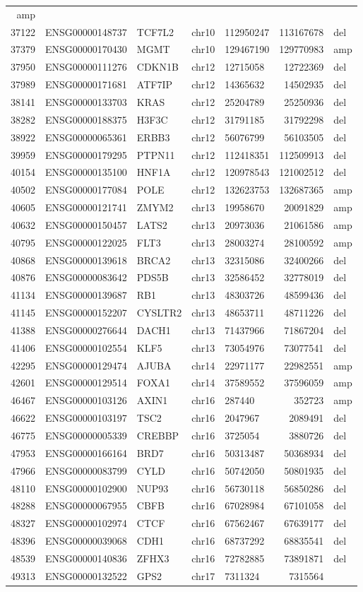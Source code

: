 \documentclass[]{article}
\begin{document}
\begin{longtable}[]{@{}rrlrlrl@{}}
amp\tabularnewline
37122 & ENSG00000148737 & TCF7L2 & chr10 & 112950247 & 113167678 &
del\tabularnewline
37379 & ENSG00000170430 & MGMT & chr10 & 129467190 & 129770983 &
amp\tabularnewline
37950 & ENSG00000111276 & CDKN1B & chr12 & 12715058 & 12722369 &
del\tabularnewline
37989 & ENSG00000171681 & ATF7IP & chr12 & 14365632 & 14502935 &
del\tabularnewline
38141 & ENSG00000133703 & KRAS & chr12 & 25204789 & 25250936 &
del\tabularnewline
38282 & ENSG00000188375 & H3F3C & chr12 & 31791185 & 31792298 &
del\tabularnewline
38922 & ENSG00000065361 & ERBB3 & chr12 & 56076799 & 56103505 &
del\tabularnewline
39959 & ENSG00000179295 & PTPN11 & chr12 & 112418351 & 112509913 &
del\tabularnewline
40154 & ENSG00000135100 & HNF1A & chr12 & 120978543 & 121002512 &
del\tabularnewline
40502 & ENSG00000177084 & POLE & chr12 & 132623753 & 132687365 &
amp\tabularnewline
40605 & ENSG00000121741 & ZMYM2 & chr13 & 19958670 & 20091829 &
amp\tabularnewline
40632 & ENSG00000150457 & LATS2 & chr13 & 20973036 & 21061586 &
amp\tabularnewline
40795 & ENSG00000122025 & FLT3 & chr13 & 28003274 & 28100592 &
amp\tabularnewline
40868 & ENSG00000139618 & BRCA2 & chr13 & 32315086 & 32400266 &
del\tabularnewline
40876 & ENSG00000083642 & PDS5B & chr13 & 32586452 & 32778019 &
del\tabularnewline
41134 & ENSG00000139687 & RB1 & chr13 & 48303726 & 48599436 &
del\tabularnewline
41145 & ENSG00000152207 & CYSLTR2 & chr13 & 48653711 & 48711226 &
del\tabularnewline
41388 & ENSG00000276644 & DACH1 & chr13 & 71437966 & 71867204 &
del\tabularnewline
41406 & ENSG00000102554 & KLF5 & chr13 & 73054976 & 73077541 &
del\tabularnewline
42295 & ENSG00000129474 & AJUBA & chr14 & 22971177 & 22982551 &
amp\tabularnewline
42601 & ENSG00000129514 & FOXA1 & chr14 & 37589552 & 37596059 &
amp\tabularnewline
46467 & ENSG00000103126 & AXIN1 & chr16 & 287440 & 352723 &
amp\tabularnewline
46622 & ENSG00000103197 & TSC2 & chr16 & 2047967 & 2089491 &
del\tabularnewline
46775 & ENSG00000005339 & CREBBP & chr16 & 3725054 & 3880726 &
del\tabularnewline
47953 & ENSG00000166164 & BRD7 & chr16 & 50313487 & 50368934 &
del\tabularnewline
47966 & ENSG00000083799 & CYLD & chr16 & 50742050 & 50801935 &
del\tabularnewline
48110 & ENSG00000102900 & NUP93 & chr16 & 56730118 & 56850286 &
del\tabularnewline
48288 & ENSG00000067955 & CBFB & chr16 & 67028984 & 67101058 &
del\tabularnewline
48327 & ENSG00000102974 & CTCF & chr16 & 67562467 & 67639177 &
del\tabularnewline
48396 & ENSG00000039068 & CDH1 & chr16 & 68737292 & 68835541 &
del\tabularnewline
48539 & ENSG00000140836 & ZFHX3 & chr16 & 72782885 & 73891871 &
del\tabularnewline
49313 & ENSG00000132522 & GPS2 & chr17 & 7311324 & 7315564 &

\end{longtable}
\end{document}
